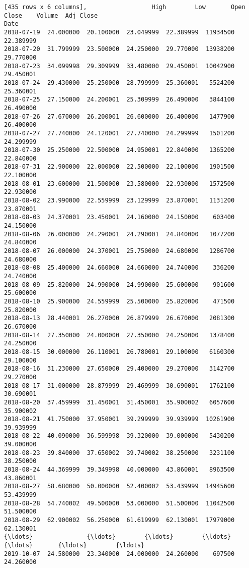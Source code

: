 \documentclass[11pt]{article}
\begin{document}
\begin{Verbatim}[commandchars=\\\{\}]
[435 rows x 6 columns],                  High        Low       Open      Close    Volume  Adj Close
Date                                                                       
2018-07-19  24.000000  20.100000  23.049999  22.389999  11934500  22.389999
2018-07-20  31.799999  23.500000  24.250000  29.770000  13938200  29.770000
2018-07-23  34.099998  29.309999  33.480000  29.450001  10042900  29.450001
2018-07-24  29.430000  25.250000  28.799999  25.360001   5524200  25.360001
2018-07-25  27.150000  24.200001  25.309999  26.490000   3844100  26.490000
2018-07-26  27.670000  26.200001  26.600000  26.400000   1477900  26.400000
2018-07-27  27.740000  24.120001  27.740000  24.299999   1501200  24.299999
2018-07-30  25.250000  22.500000  24.950001  22.840000   1365200  22.840000
2018-07-31  22.900000  22.000000  22.500000  22.100000   1901500  22.100000
2018-08-01  23.600000  21.500000  23.580000  22.930000   1572500  22.930000
2018-08-02  23.990000  22.559999  23.129999  23.870001   1131200  23.870001
2018-08-03  24.370001  23.450001  24.160000  24.150000    603400  24.150000
2018-08-06  26.000000  24.290001  24.290001  24.840000   1077200  24.840000
2018-08-07  26.000000  24.370001  25.750000  24.680000   1286700  24.680000
2018-08-08  25.400000  24.660000  24.660000  24.740000    336200  24.740000
2018-08-09  25.820000  24.990000  24.990000  25.600000    901600  25.600000
2018-08-10  25.900000  24.559999  25.500000  25.820000    471500  25.820000
2018-08-13  28.440001  26.270000  26.879999  26.670000   2081300  26.670000
2018-08-14  27.350000  24.000000  27.350000  24.250000   1378400  24.250000
2018-08-15  30.000000  26.110001  26.780001  29.100000   6160300  29.100000
2018-08-16  31.230000  27.650000  29.400000  29.270000   3142700  29.270000
2018-08-17  31.000000  28.879999  29.469999  30.690001   1762100  30.690001
2018-08-20  37.459999  31.450001  31.450001  35.900002   6057600  35.900002
2018-08-21  41.750000  37.950001  39.299999  39.939999  10261900  39.939999
2018-08-22  40.090000  36.599998  39.320000  39.000000   5430200  39.000000
2018-08-23  39.840000  37.650002  39.740002  38.250000   3231100  38.250000
2018-08-24  44.369999  39.349998  40.000000  43.860001   8963500  43.860001
2018-08-27  58.680000  50.000000  52.400002  53.439999  14945600  53.439999
2018-08-28  54.740002  49.500000  53.000000  51.500000  11042500  51.500000
2018-08-29  62.900002  56.250000  61.619999  62.130001  17979000  62.130001
{\ldots}               {\ldots}        {\ldots}        {\ldots}        {\ldots}       {\ldots}        {\ldots}
2019-10-07  24.580000  23.340000  24.000000  24.260000    697500  24.260000

\end{Verbatim}
\end{document}
